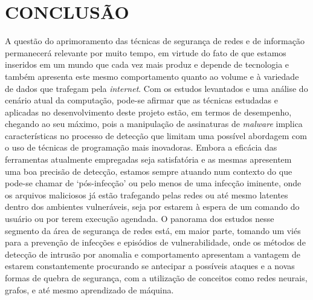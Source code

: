 \chapter{CONCLUSÃO}
\label{c.conclusao}

A questão do aprimoramento das técnicas de segurança de redes e de informação
permanecerá relevante por muito tempo, em virtude do fato de que estamos
inseridos em um mundo que cada vez mais produz e depende de tecnologia e também
apresenta este mesmo comportamento quanto ao volume e à variedade de dados que
trafegam pela \textit{internet}. Com os estudos levantados e uma análise do
cenário atual da computação, pode-se afirmar que as técnicas estudadas e
aplicadas no desenvolvimento deste projeto estão, em termos de desempenho,
chegando ao seu máximo, pois a manipulação de assinaturas de \textit{malware}
implica características no processo de detecção que limitam uma possível
abordagem com o uso de técnicas de programação mais inovadoras. Embora a
eficácia das ferramentas atualmente empregadas seja satisfatória e as mesmas
apresentem uma boa precisão de detecção, estamos sempre atuando num contexto do
que pode-se chamar de `pós-infecção' ou pelo menos de uma infecção iminente,
onde os arquivos maliciosos já estão trafegando pelas redes ou até mesmo
latentes dentro dos ambientes vulneráveis, seja por estarem à espera de um
comando do usuário ou por terem execução agendada. O panorama dos estudos nesse
segmento da área de segurança de redes está, em maior parte, tomando um viés
para a prevenção de infecções e episódios de vulnerabilidade, onde os métodos de
detecção de intrusão por anomalia e comportamento apresentam a vantagem de
estarem constantemente procurando se antecipar a possíveis ataques e a novas
formas de quebra de segurança, com a utilização de conceitos como redes neurais,
grafos, e até mesmo aprendizado de máquina.

